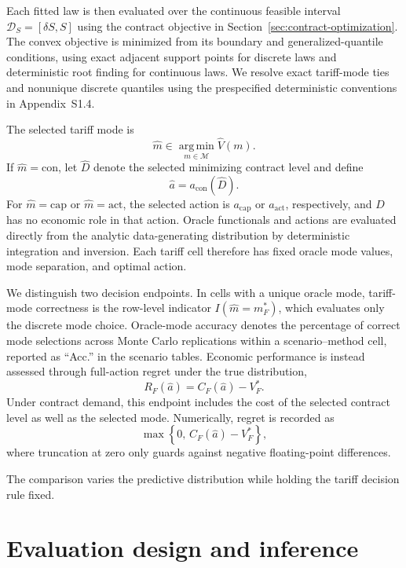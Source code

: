 \documentclass[suppldata]{interact}
\begin{document}
Each fitted law is then evaluated over the continuous feasible interval
$\mathcal D_S=[\delta S,S]$ using the contract objective in
Section~\ref{sec:contract-optimization}. The convex objective is
minimized from its boundary and generalized-quantile conditions, using
exact adjacent support points for discrete laws and deterministic root
finding for continuous laws. We resolve exact tariff-mode ties and nonunique discrete quantiles
using the prespecified deterministic conventions in Appendix~S1.4.

The selected tariff mode is
\[
\widehat m
\in
\operatorname*{arg\,min}_{m\in\mathcal M}
\widehat V(m).
\]
If $\widehat m=\mathrm{con}$, let $\widehat D$ denote the selected minimizing contract level and define
\[
\widehat a=a_{\mathrm{con}}(\widehat D).
\]
For $\widehat m=\mathrm{cap}$ or $\widehat m=\mathrm{act}$, the selected action is $a_{\mathrm{cap}}$ or $a_{\mathrm{act}}$, respectively, and $D$ has no economic role in that action. Oracle functionals and actions are evaluated directly from the analytic data-generating distribution by deterministic integration and inversion. Each tariff cell therefore has fixed oracle mode values, mode separation, and optimal action.

We distinguish two decision endpoints. In cells with a unique oracle
mode, tariff-mode correctness is the row-level indicator
$I(\widehat m=m_F^\ast)$, which evaluates only the discrete mode
choice. Oracle-mode accuracy denotes the percentage of correct mode selections across Monte Carlo replications within a scenario--method cell, reported as ``Acc.'' in the scenario tables. Economic performance is instead assessed through full-action regret under the true distribution,
\[
R_F(\widehat a)
=
C_F(\widehat a)-V_F^\ast.
\]
Under contract demand, this endpoint includes the cost of the selected contract level as well as the selected mode. Numerically, regret is recorded as
\[
\max\left\{0,\,
C_F(\widehat a)-V_F^\ast
\right\},
\]
where truncation at zero only guards against negative floating-point differences.

The comparison varies the predictive distribution while holding the
tariff decision rule fixed.

\section{Evaluation design and inference}
\label{sec:evaluation-design}
\label{sec:evaluation-inference}
\end{document}
